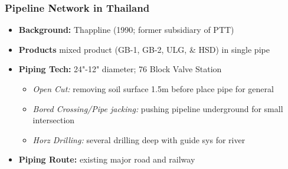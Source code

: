 \documentclass[10pt,presentation]{beamer}
\begin{document}
\begin{frame}
  \frametitle{Pipeline Network in Thailand}

  \begin{itemize}
    \item \textbf{Background:} Thappline (1990; former subsidiary of PTT)
    \item \textbf{Products} mixed product (GB-1, GB-2, ULG, \& HSD) in single pipe
    \item \textbf{Piping Tech:} 24"-12" diameter; 76 Block Valve Station
    \begin{itemize}
      \item \textsl{Open Cut:} removing soil surface 1.5m before place pipe for general
      \item \textsl{Bored Crossing/Pipe jacking:} pushing pipeline underground for small intersection
      \item \textsl{Horz Drilling:} several drilling deep with guide sys for river
    \end{itemize}
    \item \textbf{Piping Route:} existing major road and railway
  \end{itemize}

  \end{frame}

\end{document}
